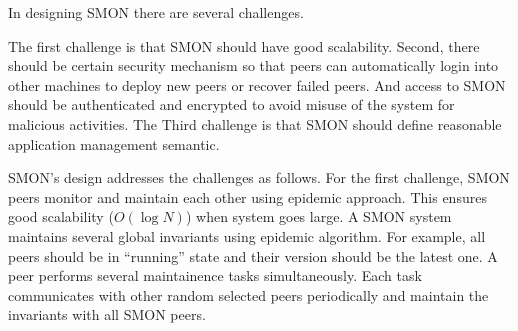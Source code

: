 


In designing SMON there are several challenges.

The first challenge is that SMON should have good
scalability.  Second, there should be certain security
mechanism so that peers can automatically login into other
machines to deploy new peers or recover failed peers. And
access to SMON should be authenticated and encrypted to
avoid misuse of the system for malicious activities.  The
Third challenge is that SMON should define reasonable
application management semantic.

SMON's design addresses the challenges as follows. For the
first challenge, SMON peers monitor and maintain each other
using epidemic approach. This ensures good scalability
($O(\log N)$) when system goes large. A SMON system
maintains several global invariants using epidemic
algorithm. For example, all peers should be in ``running''
state and their version should be the latest one. A peer
performs several maintainence tasks simultaneously. Each
task communicates with other random selected peers
periodically and maintain the invariants with all SMON
peers. 

